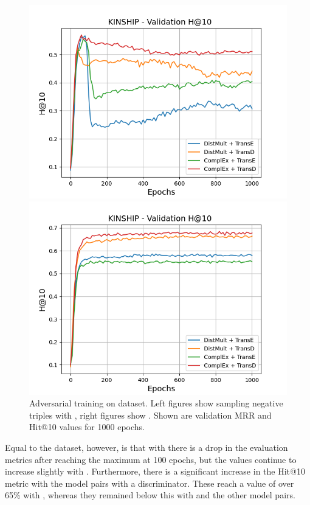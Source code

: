 \begin{figure}[H]
\begin{minipage}{.5\textwidth}
    \end{minipage}
    \begin{minipage}{.5\textwidth}
      \centering
      \includegraphics[width=0.9\linewidth]{figures/results/gan_train/not_pretrained/uncertainty/max/entropy/kinship/1k_epochs/uncertainty_kinship_hit10.png}
    \end{minipage}%
    \begin{minipage}{.5\textwidth}
      \centering
      \includegraphics[width=0.9\linewidth]{figures/results/gan_train/not_pretrained/uncertainty/max_distribution/entropy/kinship/1k_epochs/uncertainty_kinship_hit10.png}
    \end{minipage}%
    \caption{Adversarial training on \kinship dataset. 
   Left figures show sampling negative triples with \usmax, right figures show \ussoftmax.
    Shown are validation MRR and Hit@10 values for 1000 epochs.}
    \label{fig:advtrain_kinship_usmax_ussoftmax}
\end{figure}
Equal to the \umls dataset, however, is that with \usmax there is a drop in the evaluation metrics after reaching the maximum at 100 epochs, but the values continue to increase slightly with \ussoftmax.
Furthermore, there is a significant increase in the Hit@10 metric with the model pairs with a \transd discriminator.
These reach a value of over 65\% with \ussoftmax, whereas they remained below this with \usmax and the other model pairs.

